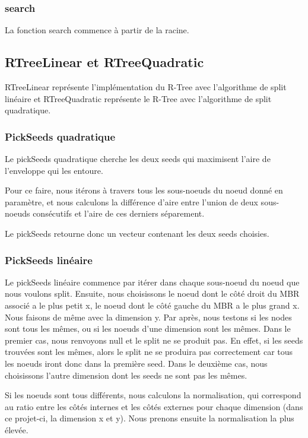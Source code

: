 \documentclass[utf8]{article}
\begin{document}
\begin{large}
  \par
  \subsubsection{search}
  \indent
  \par
  La fonction search commence à partir de la racine.

  \par
  \subsection{RTreeLinear et RTreeQuadratic}\label{RTreeLinear}
  \indent
  \par
  RTreeLinear représente l'implémentation du R-Tree avec l'algorithme de split
  linéaire et RTreeQuadratic représente le R-Tree avec l'algorithme de split quadratique.
  \par

  \subsubsection{PickSeeds quadratique}\label{PickSeeds quadratique}
  \par
  \indent
  Le pickSeeds quadratique cherche les deux seeds qui maximisent l'aire de l'enveloppe qui les entoure.
  \par
  \indent
  Pour ce faire, nous itérons à travers tous les sous-noeuds du noeud donné en paramètre,
  et nous calculons la différence d'aire entre l'union de deux sous-noeuds consécutifs et l'aire de
  ces derniers séparement.
  \par
  \par
  \indent
  Le pickSeeds retourne donc un vecteur contenant les deux seeds choisies.
  \par
  \subsubsection{PickSeeds linéaire}\label{PickSeeds lineaire}
  \indent
  \par
  Le pickSeeds linéaire commence par itérer dans chaque sous-noeud du noeud
  que nous voulons split. Ensuite, nous choisissons le noeud dont le côté droit du MBR
  associé a le plus petit x, le noeud dont le côté gauche du MBR a le plus grand
  x. Nous faisons de même avec la dimension y. Par après, nous testons si les
  nodes sont tous les mêmes, ou si les noeuds d'une dimension sont les mêmes.
  Dans le premier cas, nous renvoyons null et le split ne se produit pas. En
  effet, si les seeds trouvées sont les mêmes, alors le split ne se produira pas
  correctement car tous les noeuds iront donc dans la première seed. Dans le
  deuxième cas, nous choisissons l'autre dimension dont les seeds ne sont pas
  les mêmes.
  \par
  \indent
  \par
  Si les noeuds sont tous différents, nous calculons la normalisation, qui
  correspond au ratio entre les côtés internes et les côtés externes pour chaque
  dimension (dans ce projet-ci, la dimension x et y). Nous prenons ensuite la
  normalisation la plus élevée.
  \par


\end{large}
\end{document}
